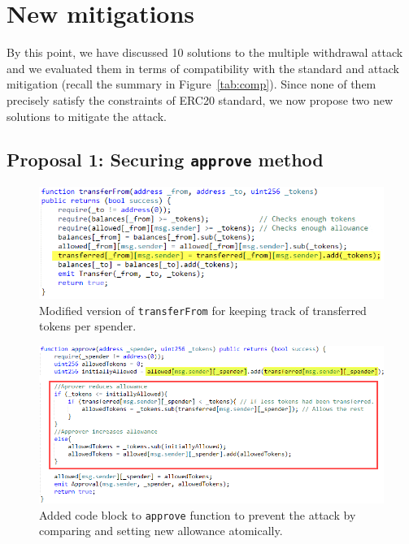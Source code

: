 
\section{New mitigations}

By this point, we have discussed 10 solutions to the multiple withdrawal attack and we evaluated them in terms of compatibility with the standard and attack mitigation (recall the summary in Figure~\ref{tab:comp}). Since none of them precisely satisfy the constraints of ERC20 standard, we now propose two new solutions to mitigate the attack.


\subsection{Proposal 1: Securing \texttt{approve} method}
\label{sec:proposal1}

\begin{figure}[t]
	\centering
	\includegraphics[width=1.0\linewidth]{figures/multiple_withdrawal_14.png}
	\caption{Modified version of \texttt{transferFrom} for keeping track of transferred tokens per spender.\label{fig:transfer1}}
\end{figure}


\begin{figure}[t]
	\centering
	\includegraphics[width=1.0\linewidth]{figures/multiple_withdrawal_15.png}
	\caption{Added code block to \texttt{approve} function to prevent the attack by comparing and setting new allowance atomically.\label{fig:approve1}}
\end{figure}


